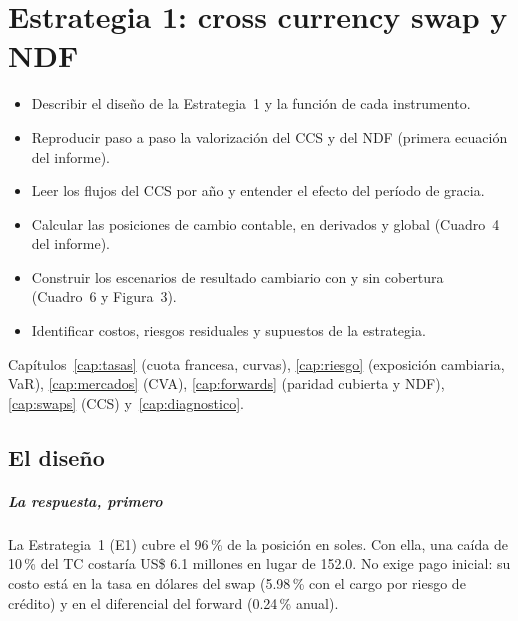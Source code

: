 \chapter{Estrategia 1: cross currency swap y NDF}\label{cap:e1}

\begin{objetivos}
\begin{itemize}
\item Describir el diseño de la Estrategia~1 y la función de cada instrumento.
\item Reproducir paso a paso la valorización del CCS y del NDF (primera ecuación del informe).
\item Leer los flujos del CCS por año y entender el efecto del período de gracia.
\item Calcular las posiciones de cambio contable, en derivados y global (Cuadro~4 del informe).
\item Construir los escenarios de resultado cambiario con y sin cobertura (Cuadro~6 y Figura~3).
\item Identificar costos, riesgos residuales y supuestos de la estrategia.
\end{itemize}
\end{objetivos}

\begin{prerreq}Capítulos~\ref{cap:tasas} (cuota francesa, curvas), \ref{cap:riesgo} (exposición cambiaria, VaR), \ref{cap:mercados} (CVA), \ref{cap:forwards} (paridad cubierta y NDF), \ref{cap:swaps} (CCS) y~\ref{cap:diagnostico}.\end{prerreq}

\section{El diseño}

\paragraph{La respuesta, primero} La Estrategia~1 (E1) cubre el 96\,\% de la posición en soles. Con ella, una caída de 10\,\% del TC costaría US\$ 6.1 millones en lugar de 152.0. No exige pago inicial: su costo está en la tasa en dólares del swap (5.98\,\% con el cargo por riesgo de crédito) y en el diferencial del forward (0.24\,\% anual).

